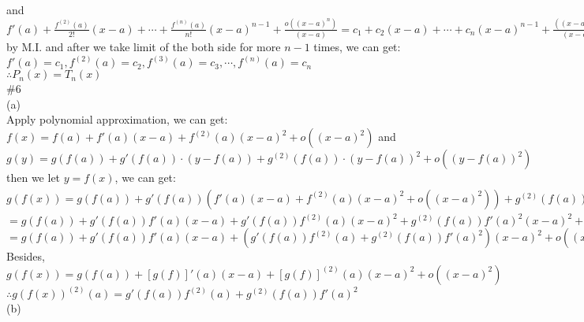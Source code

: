 \documentclass{article}
\begin{document}
and $f'(a)+\displaystyle\frac{f^{(2)}(a)}{2!}(x-a)+\cdots+\frac{f^{(n)}(a)}{n!}(x-a)^{n-1}+\frac{o\left((x-a)^n\right)}{(x-a)}=c_1+c_2(x-a)+\cdots+c_n(x-a)^{n-1}+\frac{\left((x-a)^n\right)}{(x-a)}$\\

by M.I. and after we take limit of the both side for more $n-1$ times, we can get:\\

$f'(a)=c_1, f^{(2)}(a)=c_2, f^{(3)}(a)=c_3, \cdots, f^{(n)}(a)=c_n$\\

$\therefore$\qquad$P_n(x)=T_n(x)$\\

\textcolor[rgb]{0.00,0.00,0.50}{\#6}\\

(a)\\

Apply polynomial approximation, we can get:\\

$f(x)=f(a)+f'(a)(x-a)+f^{(2)}(a)(x-a)^2+o\left((x-a)^2\right)$ and $g(y)=g(f(a))+g'(f(a))\cdot(y-f(a))+g^{(2)}(f(a))\cdot(y-f(a))^2+o\left((y-f(a))^2\right)$\\

then we let $y=f(x)$, we can get:\\

$g(f(x))=g(f(a))+g'(f(a))(f'(a)(x-a)+f^{(2)}(a)(x-a)^2+o\left((x-a)^2\right))+g^{(2)}(f(a))(f'(a)(x-a)+f^{(2)}(a)(x-a)^2+o\left((x-a)^2\right))^2+o\left((f'(a)(x-a)+f^{(2)}(a)(x-a)^2+o\left((x-a)^2\right))^2\right)$\\

\qquad\quad$=g(f(a))+g'(f(a))f'(a)(x-a)+g'(f(a))f^{(2)}(a)(x-a)^2+g^{(2)}(f(a))f'(a)^2(x-a)^2+2g^{(2)}(f(a))f'(a)f^{(2)}(a)(x-a)^3+g^{(2)}(f(a))f^{(2)}(a)^2(x-a)^4$\\

\qquad\quad$=g(f(a))+g'(f(a))f'(a)(x-a)+\left(g'(f(a))f^{(2)}(a)+g^{(2)}(f(a))f'(a)^2\right)(x-a)^2+o\left((x-a)^2\right)$\\

Besides, $g(f(x))=g(f(a))+\left[g(f)\right]'(a)(x-a)+\left[g(f)\right]^{(2)}(a)(x-a)^2+o\left((x-a)^2\right)$\\

$\therefore$\qquad$g(f(x))^{(2)}(a)=g'(f(a))f^{(2)}(a)+g^{(2)}(f(a))f'(a)^2$\\

(b)\\
\end{document}
